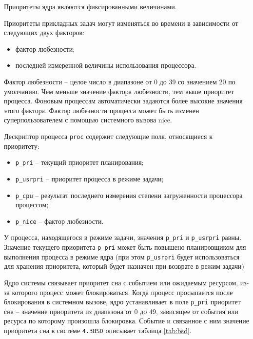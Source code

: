 \documentclass[a4paper,12pt]{bmstu}
\begin{document}
Приоритеты ядра являются фиксированными величинами.

Приоритеты прикладных задач могут изменяться во времени в зависимости от следующих двух факторов:
\begin{itemize}
    \item фактор любезности;
    \item последней измеренной величины использования процессора.
\end{itemize}

Фактор любезности – целое число в диапазоне от 0 до 39 со значением 20 по умолчанию. Чем меньше значение фактора любезности, тем выше приоритет процесса. Фоновым процессам автоматически задаются более высокие значения этого фактора. Фактор любезности процесса может быть изменен суперпользователем с помощью системного вызова nice.

Дескриптор процесса \texttt{proc} содержит следующие поля, относящиеся к приоритету:
\begin{itemize}
    \item \texttt{p\_pri} – текущий приоритет планирования;
    \item \texttt{p\_usrpri} – приоритет процесса в режиме задачи;
    \item \texttt{p\_cpu} – результат последнего измерения степени загруженности процессора процессом;
    \item \texttt{p\_nice} – фактор любезности.
\end{itemize}

У процесса, находящегося в режиме задачи, значения \texttt{p\_pri} и \texttt{p\_usrpri} равны. Значение текущего приоритета \texttt{p\_pri} может быть повышено планировщиком для выполнения процесса в режиме ядра (при этом \texttt{p\_usrpri} будет использоваться для хранения приоритета, который будет назначен при возврате в режим задачи)

Ядро системы связывает приоритет сна с событием или ожидаемым ресурсом, из-за которого процесс может блокироваться. Когда процесс просыпается после блокирования в системном вызове, ядро устанавливает в поле \texttt{p\_pri} приоритет сна – значение приоритета из диапазона от 0 до 49, зависящее от события или ресурса по которому произошла блокировка. Событие и связанное с ним значение приоритета сна в системе \texttt{4.3BSD} описывает таблица \ref{tab:bsd}.
\end{document}
